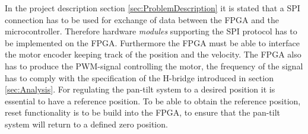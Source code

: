 \documentclass[../../main.tex]{subfiles}
\begin{document}
In the project description section \ref{sec:ProblemDescription} it is stated that a SPI connection has to be used for exchange of data between the FPGA and the microcontroller. Therefore hardware \textit{modules} supporting the SPI protocol has to be implemented on the FPGA. Furthermore the FPGA must be able to interface the motor encoder keeping track of the position and the velocity. The FPGA also has to produce the PWM-signal controlling the motor, the frequency of the signal has to comply with the specification of the H-bridge introduced in section \ref{sec:Analysis}. For regulating the pan-tilt system to a desired position it is essential to have a reference position. To be able to obtain the reference position, reset functionality is to be build into the FPGA, to ensure that the pan-tilt system will return to a defined zero position. 





\end{document}
